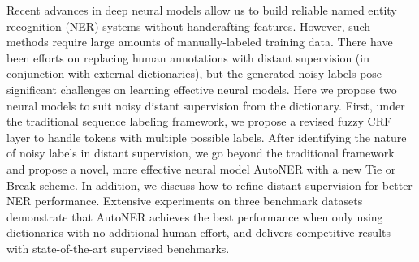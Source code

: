 Recent advances in deep neural models allow us to build reliable named entity recognition (NER) systems without handcrafting features. However, such methods require large amounts of manually-labeled training data. There have been efforts on replacing human annotations with distant supervision (in conjunction with external dictionaries), but the generated noisy labels pose significant challenges on learning effective neural models. Here we propose two neural models to suit noisy distant supervision from the dictionary. First, under the traditional sequence labeling framework, we propose a revised fuzzy CRF layer to handle tokens with multiple possible labels. After identifying the nature of noisy labels in distant supervision, we go beyond the traditional framework and propose a novel, more effective neural model AutoNER with a new Tie or Break scheme. In addition, we discuss how to refine distant supervision for better NER performance. Extensive experiments on three benchmark datasets demonstrate that AutoNER achieves the best performance when only using dictionaries with no additional human effort, and delivers competitive results with state-of-the-art supervised benchmarks.
